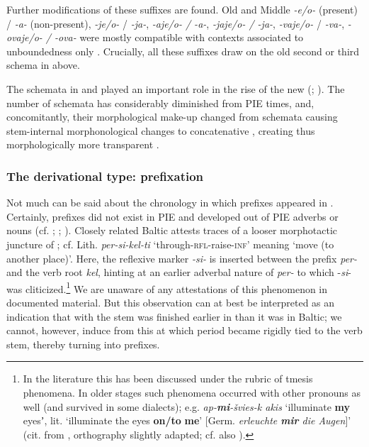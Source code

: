 \documentclass[output=paper]{langsci/langscibook}
\begin{document}
Further modifications of these suffixes are found. Old and Middle  \textit{-e/o-} (present) / \textit{-a-} (non-present), \textit{-je/o-} / \textit{-ja-}, \textit{-aje/o- / -a-}, \textit{-jaje/o- / -ja-}, \textit{-vaje/o-} / \textit{-va-}, \textit{-ovaje/o- / -ova-} were mostly compatible with contexts associated to unboundedness only \citep[162]{Silina1982}. Crucially, all these suffixes draw on the old second or third schema in  above.

The schemata in  and  played an important role in the rise of the new  (\citealt{Maslov2004[1959]}; \citealt{Meillet1965}). The number of schemata has considerably diminished from PIE times, and, concomitantly, their morphological make-up changed from schemata causing stem-internal morphonological changes to concatenative , creating thus morphologically more transparent .

\subsubsection{The derivational type: prefixation}\label{sec:wiemerserzant:3.2.2}

Not much can be said about the chronology in which prefixes appeared in . Certainly, prefixes did not exist in PIE and  developed out of PIE adverbs or nouns (cf. \citealt[82]{Chantraine1953}; \citealt{Cuzzolin2006}; \citealt{DeLazero2012}). Closely related Baltic attests traces of a looser morphotactic juncture of ; cf. Lith. \textit{per-si-kel-ti} ‘through-\textsc{rfl}-raise-\textsc{inf’} meaning ‘move (to another place)’. Here, the reflexive marker \textit{-si-} is inserted between the prefix \textit{per-} and the verb root \textit{kel}, hinting at an earlier adverbal nature of \textit{per-} to which -\textit{si}- was cliticized.\footnote{In the literature this has been discussed under the rubric of tmesis phenomena. In older stages such phenomena occurred with other  pronouns as well (and survived in some dialects); e.g. \textit{ap-\textbf{{mi}}-švies-k akis} ‘illuminate \textbf{my} eyesʼ, lit. ‘illuminate the eyes \textbf{on/to} \textbf{me}’ [Germ. \textit{erleuchte \textbf{mir} die Augen}]’ (cit. from \citealt[10f.]{Rosinas1995}, orthography slightly adapted; cf. also \citealt[83--87]{Ambrazas2006}).} We are unaware of any attestations of this phenomenon in documented  material. But this observation can at best be interpreted as an indication that  with the stem was finished earlier in  than it was in Baltic; we cannot, however, induce from this at which period  became rigidly tied to the verb stem, thereby turning into prefixes.
\end{document}
